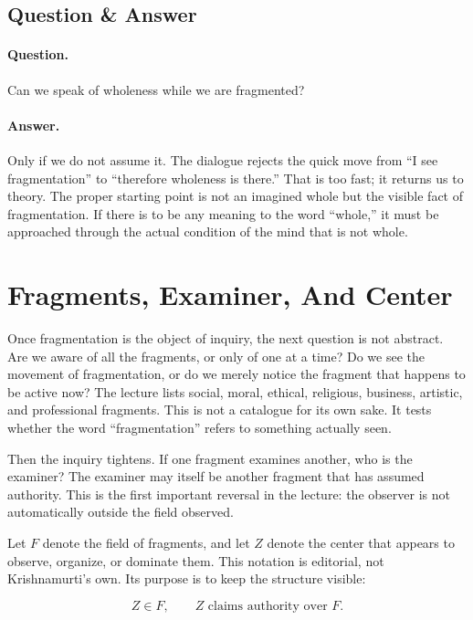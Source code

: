 \subsection{Question \& Answer}

\paragraph{Question.}
Can we speak of wholeness while we are fragmented?

\paragraph{Answer.}
Only if we do not assume it. The dialogue rejects the quick move from ``I see fragmentation'' to ``therefore wholeness is there.'' That is too fast; it returns us to theory. The proper starting point is not an imagined whole but the visible fact of fragmentation. If there is to be any meaning to the word ``whole,'' it must be approached through the actual condition of the mind that is not whole.

\section{Fragments, Examiner, And Center}

Once fragmentation is the object of inquiry, the next question is not abstract. Are we aware of all the fragments, or only of one at a time? Do we see the movement of fragmentation, or do we merely notice the fragment that happens to be active now? The lecture lists social, moral, ethical, religious, business, artistic, and professional fragments. This is not a catalogue for its own sake. It tests whether the word ``fragmentation'' refers to something actually seen.

Then the inquiry tightens. If one fragment examines another, who is the examiner? The examiner may itself be another fragment that has assumed authority. This is the first important reversal in the lecture: the observer is not automatically outside the field observed.

Let \(F\) denote the field of fragments, and let \(Z\) denote the center that appears to observe, organize, or dominate them. This notation is editorial, not Krishnamurti's own. Its purpose is to keep the structure visible:

\begin{equation}
Z \in F,
\qquad
Z \text{ claims authority over } F.
\end{equation}

